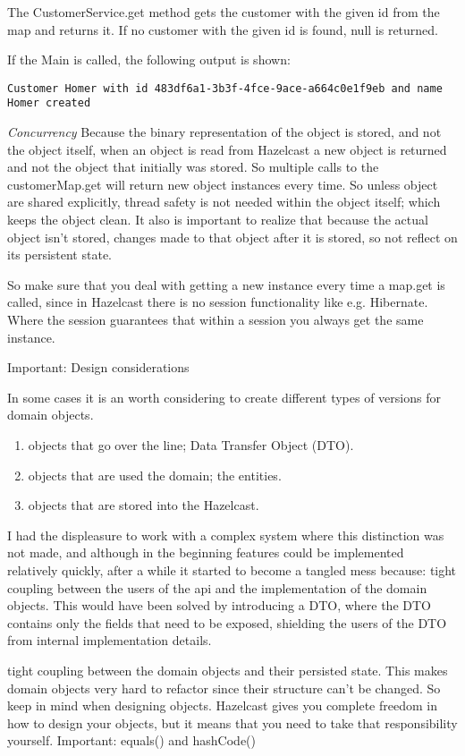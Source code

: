The CustomerService.get method gets the customer with the given id from the map and returns it. If no customer with the given id is found, null is returned. 

If the Main is called,  the following output is shown:
\begin{verbatim}
Customer Homer with id 483df6a1-3b3f-4fce-9ace-a664c0e1f9eb and name Homer created
\end{verbatim}	

\emph{Concurrency} Because the binary representation of the object is stored, and not the object itself, when an object is read from Hazelcast a new object is returned and not the object that initially was stored. So multiple calls to the customerMap.get will return new object instances every time. So unless object are shared explicitly, thread safety is not needed within the object itself; which keeps the object clean. It also is important to realize that because the actual object isn't stored, changes made to that object after it is stored, so not reflect on its persistent state.
 
So make sure that you deal with getting a new instance every time a map.get is called, since in Hazelcast there is no session functionality like e.g. Hibernate. Where the session guarantees that within a session you always get the same instance. 

Important: Design considerations

In some cases it is an worth considering to create different types of versions for domain objects.
\begin{enumerate}
\item objects that go over the line; Data Transfer Object (DTO).
\item objects that are used the domain; the entities.
\item objects that are stored into the Hazelcast.
\end{enumerate}

I had the displeasure to work with a complex system where this distinction was not made, and although in the beginning features could be implemented relatively quickly, after a while it started to become a tangled mess because:
tight coupling between the users of the api and the implementation of the domain objects. This would have been solved by introducing a DTO, where the DTO contains only the fields that need to be exposed, shielding the users of the DTO from internal implementation details.

tight coupling between the domain objects and their persisted state. This makes domain objects very hard to refactor since their structure can't be changed.
So keep in mind when designing objects. Hazelcast gives you complete freedom in how to design your objects, but it means that you need to take that responsibility yourself.
Important: equals() and hashCode()

